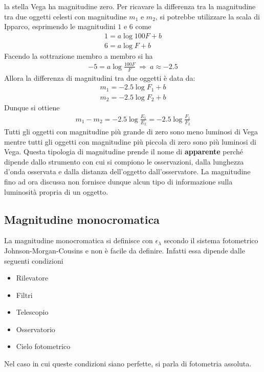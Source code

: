\documentclass[a4paper, oneside]{book}
\begin{document}
la stella Vega ha magnitudine zero. Per ricavare la differenza tra la magnitudine tra due oggetti celesti 
con magnitudine $m_1$ e $m_2$, si potrebbe utilizzare la scala di Ipparco, esprimendo le magnitudini $ 1$ e $6$ come
\begin{gather*}
    1 = a \log 100F + b \\
    6 = a \log F + b
\end{gather*}
Facendo la sottrazione membro a membro si ha
\begin{gather*}
    -5 = a \log \frac{100F}{F} \ \Longrightarrow \ a \approx -2.5
\end{gather*}
Allora la differenza di magnitudini tra due oggetti è data da:
\begin{gather*}
    m_1 = -2.5\log F_1 + b \\
    m_2 = -2.5\log F_2 + b
\end{gather*}
Dunque si ottiene
\begin{gather*}
    m_1 - m_2 = -2.5\log \frac{E_1}{E_2} = -2.5\log\frac{F_1}{F_2}
\end{gather*}
Tutti gli oggetti con magnitudine più grande di zero sono meno luminosi
di Vega mentre tutti gli oggetti con magnitudine più piccola di zero sono
più luminosi di Vega. Questa tipologia di magnitudine prende il nome di \textbf{apparente}
perché dipende dallo strumento con cui si compiono le osservazioni, dalla lunghezza
d'onda osservata e dalla distanza dell'oggetto dall'osservatore. La magnitudine fino ad ora discussa non fornisce dunque alcun tipo di 
informazione sulla luminosità propria di un oggetto.

\subsection{Magnitudine monocromatica}
La magnitudine monocromatica si definisce con $\epsilon_\lambda$ secondo il 
sistema fotometrico Johnson-Morgan-Cousins e non è facile da definire. Infatti essa dipende
dalle seguenti condizioni 
\begin{itemize}
    \item Rilevatore 
    \item Filtri
    \item Telescopio
    \item Osservatorio
    \item Cielo fotometrico
\end{itemize}
Nel caso in cui queste condizioni siano perfette, si parla di fotometria assoluta.
\end{document}
